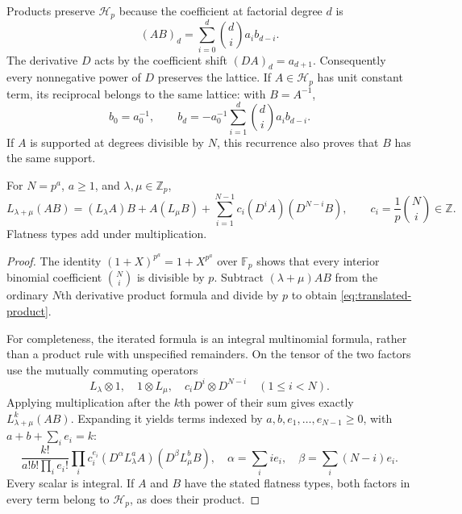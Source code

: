 Products preserve $\mathcal H_p$ because the coefficient at factorial
degree $d$ is
\[
 (AB)_d=\sum_{i=0}^d\binom di a_i b_{d-i}.
\]
The derivative $D$ acts by the coefficient shift $(DA)_d=a_{d+1}$.
Consequently every nonnegative power of $D$ preserves the lattice.
If $A\in\mathcal H_p$ has unit constant term, its reciprocal belongs to
the same lattice: with $B=A^{-1}$,
\begin{equation}
 b_0=a_0^{-1},\qquad
 b_d=-a_0^{-1}\sum_{i=1}^d\binom di a_i b_{d-i}.
 \label{eq:hurwitz-reciprocal-recurrence}
\end{equation}
If $A$ is supported at degrees divisible by $N$, this recurrence also
proves that $B$ has the same support.

\begin{lemma}
\label{lem:translated-hurwitz-product}
For $N=p^a$, $a\geq1$, and $\lambda,\mu\in\mathbb Z_p$,
\begin{equation}
 L_{\lambda+\mu}(AB)
  =(L_\lambda A)B+A(L_\mu B)
       +\sum_{i=1}^{N-1}c_i(D^iA)(D^{N-i}B),
 \qquad c_i=\frac1p\binom Ni\in\mathbb Z.
 \label{eq:translated-product}
\end{equation}
Flatness types add under multiplication.
\end{lemma}

\begin{proof}
The identity $(1+X)^{p^a}=1+X^{p^a}$ over $\mathbb F_p$ shows that every
interior binomial coefficient $\binom Ni$ is divisible by $p$.
Subtract $(\lambda+\mu)AB$ from the ordinary $N$th derivative product
formula and divide by $p$ to obtain \eqref{eq:translated-product}.

For completeness, the iterated formula is an integral multinomial
formula, rather than a product rule with unspecified remainders. On the
tensor of the two factors use the mutually commuting operators
\[
 L_\lambda\otimes1,\quad 1\otimes L_\mu,\quad
 c_iD^i\otimes D^{N-i}\quad(1\leq i<N).
\]
Applying multiplication after the $k$th power of their sum gives exactly
$L_{\lambda+\mu}^k(AB)$. Expanding it yields terms indexed by
$a,b,e_1,\ldots,e_{N-1}\geq0$, with $a+b+\sum_i e_i=k$:
\begin{equation}
 \frac{k!}{a!b!\prod_i e_i!}\prod_i c_i^{e_i}
 (D^\alpha L_\lambda^a A)(D^\beta L_\mu^b B),
 \quad
 \alpha=\sum_i i e_i,\quad
 \beta=\sum_i(N-i)e_i.
 \label{eq:translated-multinomial}
\end{equation}
Every scalar is integral. If $A$ and $B$ have the stated flatness types,
both factors in every term belong to $\mathcal H_p$, as does their product.
\end{proof}

